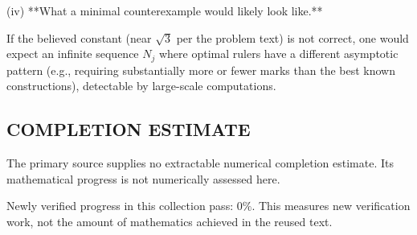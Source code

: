 (iv) **What a minimal counterexample would likely look like.**

If the believed constant (near $\sqrt3$ per the problem text) is not correct, one would expect an infinite sequence $N_j$ where optimal rulers have a different asymptotic pattern (e.g., requiring substantially more or fewer marks than the best known constructions), detectable by large-scale computations.




\subsection*{COMPLETION ESTIMATE}
The primary source supplies no extractable numerical completion estimate. Its mathematical progress is not numerically assessed here.

Newly verified progress in this collection pass: $0\%$. This measures new verification work, not the amount of mathematics achieved in the reused text.
